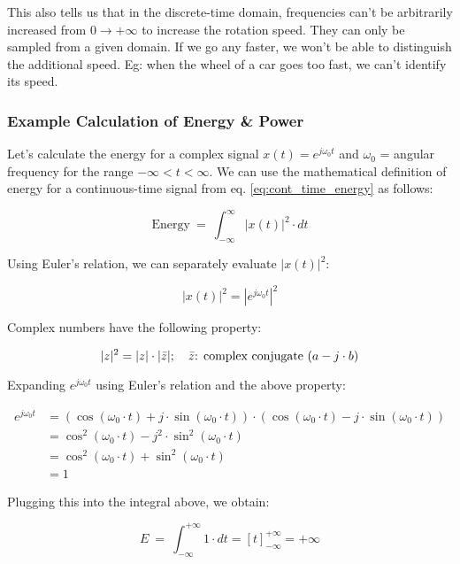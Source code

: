 \documentclass[letterpaper,12pt]{article}
\begin{document}
This also tells us that in the discrete-time domain, frequencies can't be arbitrarily increased from $0 \to +\infty$ to increase the rotation speed. They can only be sampled from a given domain. If we go any faster, we won't be able to distinguish the additional speed. Eg: when the wheel of a car goes too fast, we can't identify its speed.

\subsubsection*{Example Calculation of Energy \& Power}
Let's calculate the energy for a complex signal $x(t) = e^{j{\omega_0}t}$  and $\omega_0$ = angular frequency for the range $-\infty < t < \infty$. We can use the mathematical definition of energy for a continuous-time signal from eq. \ref{eq:cont_time_energy} as follows:

\[\text{Energy}\ =\ \int_{-\infty}^{\infty}\left|x\left(t\right)\right|^{2}\cdot dt\]

Using Euler's relation, we can separately evaluate $|x(t)|^2$:

\[|x(t)|^{2}=|e^{j\omega_{0}t}|^{2}\]

Complex numbers have the following property:

\[|z|^2=|z|\cdot|\Bar{z}|; \quad \Bar{z}\text{: complex conjugate } (a-j\cdot b)\]

Expanding $e^{j\omega_{0}t}$ using Euler's relation and the above property:

\begin{equation*}
    \begin{aligned}
        e^{j\omega_{0}t} & = (\cos(\omega_0 \cdot t) + j\cdot \sin(\omega_0 \cdot t)) \cdot (\cos(\omega_0 \cdot t) - j\cdot \sin(\omega_0 \cdot t)) \\
                         & = \cos^2(\omega_0 \cdot t) - j^2\cdot \sin^2(\omega_0 \cdot t)                                                            \\
                         & = \cos^2(\omega_0 \cdot t) + \sin^2(\omega_0 \cdot t)                                                                     \\
                         & = 1
    \end{aligned}
\end{equation*}

Plugging this into the integral above, we obtain:

\[E\ =\ \int_{-\infty}^{+\infty}1\cdot dt=\left[t\right]_{-\infty}^{+\infty}=+\infty\]
\end{document}
